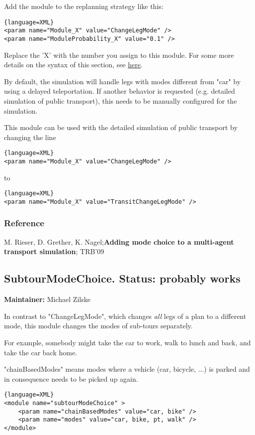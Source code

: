 Add the module to the replanning strategy like this:
\begin{lstlisting}{language=XML}
<param name="Module_X" value="ChangeLegMode" />
<param name="ModuleProbability_X" value="0.1" />
\end{lstlisting}

Replace the 'X' with the number you assign to this module. For some more details on the syntax of this section, see \href{http://matsim.org/node/478}{here}.

By default, the simulation will handle legs with modes different from  "car" by using a delayed teleportation. If another behavior is  requested (e.g. detailed simulation of public transport), this needs to  be manually configured for the simulation.

This module can be used with the detailed simulation of public transport by changing the line

\begin{lstlisting}{language=XML}
<param name="Module_X" value="ChangeLegMode" />
\end{lstlisting}

to

\begin{lstlisting}{language=XML}
<param name="Module_X" value="TransitChangeLegMode" />
\end{lstlisting}

\subsubsection{Reference}

M. Rieser, D. Grether, K. Nagel;\textbf{Adding mode choice to a multi-agent transport simulation}; TRB'09

\subsection{SubtourModeChoice. Status: probably works}

\textbf{Maintainer:} Michael Zilske

In contrast to "ChangeLegMode", which changes \emph{all} legs of a plan to a different mode, this module changes the modes of sub-tours separately.

For example, somebody might take the car to work, walk to lunch and back, and take the car back home.

"chainBasedModes" means modes where a vehicle (car, bicycle,  ...) is parked and in consequence needs to be picked up again.
\begin{lstlisting}{language=XML}
<module name="subtourModeChoice" >
    <param name="chainBasedModes" value="car, bike" />
    <param name="modes" value="car, bike, pt, walk" />
</module>
\end{lstlisting}


